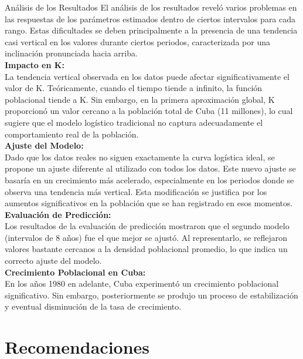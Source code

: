 \documentclass[a4paper,10pt,twocolumn]{article}
\begin{document}
Análisis de los Resultados
El análisis de los resultados reveló varios problemas en las respuestas de los parámetros estimados dentro de ciertos intervalos para cada rango. Estas dificultades se deben principalmente a la presencia de una tendencia casi vertical en los valores durante ciertos periodos, caracterizada por una inclinación pronunciada hacia arriba.\\
\textbf{Impacto en K: }\\
La tendencia vertical observada en los datos puede afectar significativamente el valor de K. Teóricamente, cuando el tiempo tiende a infinito, la función poblacional tiende a K. Sin embargo, en la primera aproximación global, K proporcionó un valor cercano a la población total de Cuba (11 millones), lo cual sugiere que el modelo logístico tradicional no captura adecuadamente el comportamiento real de la población.\\
\textbf{Ajuste del Modelo:}\\
Dado que los datos reales no siguen exactamente la curva logística ideal, se propone un ajuste diferente al utilizado con todos los datos. Este nuevo ajuste se basaría en un crecimiento más acelerado, especialmente en los periodos donde se observa una tendencia más vertical. Esta modificación se justifica por los aumentos significativos en la población que se han registrado en esos momentos.\\
\textbf{Evaluación de Predicción:}\\
Los resultados de la evaluación de predicción mostraron que el segundo modelo (intervalos de 8 años) fue el que mejor se ajustó. Al representarlo, se reflejaron valores bastante cercanos a la densidad poblacional promedio, lo que indica un correcto ajuste del modelo.\\
\textbf{Crecimiento Poblacional en Cuba:}\\
En los años 1980 en adelante, Cuba experimentó un crecimiento poblacional significativo. Sin embargo, posteriormente se produjo un proceso de estabilización y eventual disminución de la tasa de crecimiento.


\section{Recomendaciones}\label{sec:rec}
\end{document}
